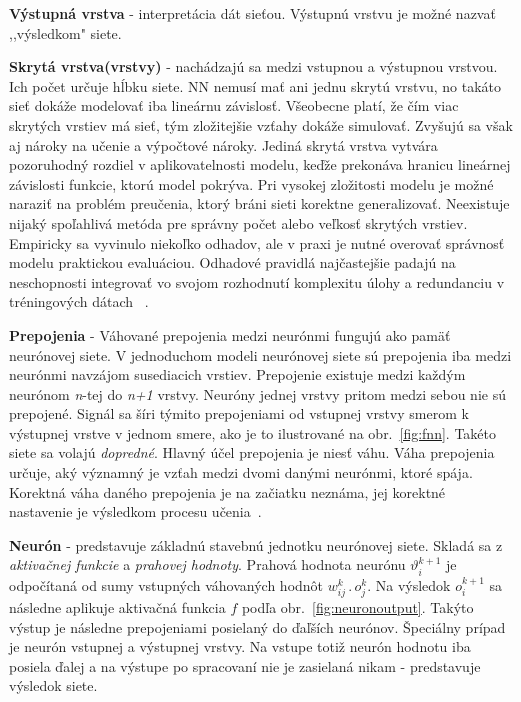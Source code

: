 \textbf{Výstupná vrstva} - interpretácia dát sieťou. Výstupnú vrstvu je možné nazvať ,,výsledkom" siete.
\noindent

\textbf{Skrytá vrstva(vrstvy)} - nachádzajú sa medzi vstupnou a výstupnou vrstvou. Ich počet určuje hĺbku siete. NN nemusí mať ani jednu skrytú vrstvu, no takáto sieť dokáže modelovať iba lineárnu závislosť. Všeobecne platí, že čím viac skrytých vrstiev má sieť, tým zložitejšie vzťahy dokáže simulovať. Zvyšujú sa však aj nároky na učenie a výpočtové nároky. Jediná skrytá vrstva vytvára pozoruhodný rozdiel v aplikovatelnosti modelu, keďže prekonáva hranicu lineárnej závislosti funkcie, ktorú model pokrýva. Pri vysokej zložitosti modelu je možné naraziť na problém preučenia, ktorý bráni sieti korektne generalizovať. Neexistuje nijaký spoľahlivá metóda pre správny počet alebo veľkosť skrytých vrstiev. Empiricky sa vyvinulo niekoľko odhadov, ale v praxi je nutné overovať správnosť modelu praktickou evaluáciou. Odhadové pravidlá najčastejšie padajú na neschopnosti integrovať vo svojom rozhodnutí komplexitu úlohy a redundanciu v tréningových dátach ~\cite{Goodfellow-et-al-2016-Book}.
\noindent

\textbf{Prepojenia} - Váhované prepojenia medzi neurónmi fungujú ako pamäť neurónovej siete. V jednoduchom modeli neurónovej siete sú prepojenia iba medzi neurónmi navzájom susediacich vrstiev. Prepojenie existuje medzi každým neurónom \textit{n}-tej do \textit{n+1} vrstvy. Neuróny jednej vrstvy pritom medzi sebou nie sú prepojené. Signál sa šíri týmito prepojeniami od vstupnej vrstvy smerom k výstupnej vrstve v jednom smere, ako je to ilustrované na obr.~\ref{fig:fnn}. Takéto siete sa volajú \textit{dopredné}. Hlavný účel prepojenia je niesť váhu. Váha prepojenia určuje, aký významný je vzťah medzi dvomi danými neurónmi, ktoré spája. Korektná váha daného prepojenia je na začiatku neznáma, jej korektné nastavenie je výsledkom procesu učenia~\cite{Goodfellow-et-al-2016-Book}.
\noindent

\textbf{Neurón} - predstavuje základnú stavebnú jednotku neurónovej siete. Skladá sa z \textit{aktivačnej funkcie} a \textit{prahovej hodnoty}. Prahová hodnota neurónu $\vartheta _{i}^{k+1}$  je odpočítaná od sumy vstupných váhovaných hodnôt $ w_{ij}^{k}\, .\, o_{j}^{k}$. 
\newline
Na výsledok $o_{i}^{k+1}$ sa následne aplikuje aktivačná funkcia $f$ podľa obr.~\ref{fig:neuronoutput}. Takýto výstup je následne prepojeniami posielaný do ďaľších neurónov. Špeciálny prípad je neurón vstupnej a výstupnej vrstvy. Na vstupe totiž neurón hodnotu iba posiela ďalej a na výstupe po spracovaní nie je zasielaná nikam - predstavuje výsledok siete.
\newline



